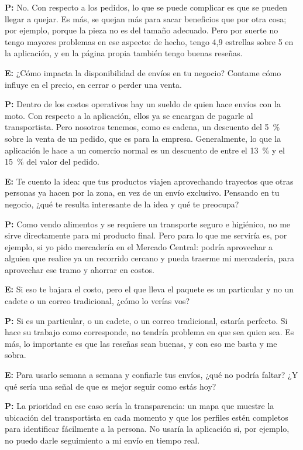 {\noindent\textbf{P:} No. Con respecto a los pedidos, lo que se puede complicar es que se pueden llegar a quejar. Es más, se quejan más para sacar beneficios que por otra cosa; por ejemplo, porque la pieza no es del tamaño adecuado. Pero por suerte no tengo mayores problemas en ese aspecto: de hecho, tengo 4,9 estrellas sobre 5 en la aplicación, y en la página propia también tengo buenas reseñas.

\noindent\textbf{E:} ¿Cómo impacta la disponibilidad de envíos en tu negocio? Contame cómo influye en el precio, en cerrar o perder una venta.

\noindent\textbf{P:} Dentro de los costos operativos hay un sueldo de quien hace envíos con la moto. Con respecto a la aplicación, ellos ya se encargan de pagarle al transportista. Pero nosotros tenemos, como es cadena, un descuento del 5~\% sobre la venta de un pedido, que es para la empresa. Generalmente, lo que la aplicación le hace a un comercio normal es un descuento de entre el 13~\% y el 15~\% del valor del pedido.

\noindent\textbf{E:} Te cuento la idea: que tus productos viajen aprovechando trayectos que otras personas ya hacen por la zona, en vez de un envío exclusivo. Pensando en tu negocio, ¿qué te resulta interesante de la idea y qué te preocupa?

\noindent\textbf{P:} Como vendo alimentos y se requiere un transporte seguro e higiénico, no me sirve directamente para mi producto final. Pero para lo que me serviría es, por ejemplo, si yo pido mercadería en el Mercado Central: podría aprovechar a alguien que realice ya un recorrido cercano y pueda traerme mi mercadería, para aprovechar ese tramo y ahorrar en costos.

\noindent\textbf{E:} Si eso te bajara el costo, pero el que lleva el paquete es un particular y no un cadete o un correo tradicional, ¿cómo lo verías vos?

\noindent\textbf{P:} Si es un particular, o un cadete, o un correo tradicional, estaría perfecto. Si hace su trabajo como corresponde, no tendría problema en que sea quien sea. Es más, lo importante es que las reseñas sean buenas, y con eso me basta y me sobra.

\noindent\textbf{E:} Para usarlo semana a semana y confiarle tus envíos, ¿qué no podría faltar? ¿Y qué sería una señal de que es mejor seguir como estás hoy?

\noindent\textbf{P:} La prioridad en ese caso sería la transparencia: un mapa que muestre la ubicación del transportista en cada momento y que los perfiles estén completos para identificar fácilmente a la persona. No usaría la aplicación si, por ejemplo, no puedo darle seguimiento a mi envío en tiempo real.

}
